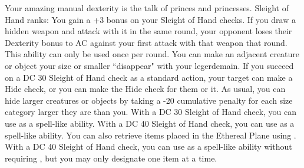 \skillfeat
{Your amazing manual dexterity is the talk of princes and princesses.}
{Sleight of Hand ranks:}
{You gain a +3 bonus on your Sleight of Hand checks.}
{If you draw a hidden weapon and attack with it in the same round, your opponent loses their Dexterity bonus to AC against your first attack with that weapon that round. This ability can only be used once per round.}
{You can make an adjacent creature or object your size or smaller ``disappear" with your legerdemain. If you succeed on a DC 30 Sleight of Hand check as a standard action, your target can make a Hide check, or you can make the Hide check for them or it. As usual, you can hide larger creatures or objects by taking a -20 cumulative penalty for each size category larger they are than you.}
{With a DC 30 Sleight of Hand check, you can use  as a spell-like ability.}
{With a DC 40 Sleight of Hand check, you can use  as a spell-like ability. You can also retrieve items placed in the Ethereal Plane using . With a DC 40 Sleight of Hand check, you can use  as a spell-like ability without requiring , but you may only designate one item at a time.}